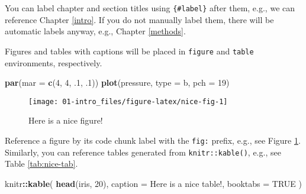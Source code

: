 \documentclass[
]{book}
\newenvironment{Shaded}{\begin{snugshade}}{\end{snugshade}}
\newcommand{\AttributeTok}[1]{\textcolor[rgb]{0.13,0.29,0.53}{#1}}
\newcommand{\ConstantTok}[1]{\textcolor[rgb]{0.56,0.35,0.01}{#1}}
\newcommand{\DecValTok}[1]{\textcolor[rgb]{0.00,0.00,0.81}{#1}}
\newcommand{\FunctionTok}[1]{\textcolor[rgb]{0.13,0.29,0.53}{\textbf{#1}}}
\newcommand{\NormalTok}[1]{#1}
\newcommand{\SpecialCharTok}[1]{\textcolor[rgb]{0.81,0.36,0.00}{\textbf{#1}}}
\newcommand{\StringTok}[1]{\textcolor[rgb]{0.31,0.60,0.02}{#1}}
\begin{document}
You can label chapter and section titles using \texttt{\{\#label\}} after them, e.g., we can reference Chapter \ref{intro}. If you do not manually label them, there will be automatic labels anyway, e.g., Chapter \ref{methods}.

Figures and tables with captions will be placed in \texttt{figure} and \texttt{table} environments, respectively.

\begin{Shaded}
\begin{Highlighting}[]
\FunctionTok{par}\NormalTok{(}\AttributeTok{mar =} \FunctionTok{c}\NormalTok{(}\DecValTok{4}\NormalTok{, }\DecValTok{4}\NormalTok{, .}\DecValTok{1}\NormalTok{, .}\DecValTok{1}\NormalTok{))}
\FunctionTok{plot}\NormalTok{(pressure, }\AttributeTok{type =} \StringTok{\textquotesingle{}b\textquotesingle{}}\NormalTok{, }\AttributeTok{pch =} \DecValTok{19}\NormalTok{)}
\end{Highlighting}
\end{Shaded}

\begin{figure}

{\centering \texttt{[image: 01-intro\_files/figure-latex/nice-fig-1]} 

}

\caption{Here is a nice figure!}\label{fig:nice-fig}
\end{figure}

Reference a figure by its code chunk label with the \texttt{fig:} prefix, e.g., see Figure \ref{fig:nice-fig}. Similarly, you can reference tables generated from \texttt{knitr::kable()}, e.g., see Table \ref{tab:nice-tab}.

\begin{Shaded}
\begin{Highlighting}[]
\NormalTok{knitr}\SpecialCharTok{::}\FunctionTok{kable}\NormalTok{(}
  \FunctionTok{head}\NormalTok{(iris, }\DecValTok{20}\NormalTok{), }\AttributeTok{caption =} \StringTok{\textquotesingle{}Here is a nice table!\textquotesingle{}}\NormalTok{,}
  \AttributeTok{booktabs =} \ConstantTok{TRUE}
\NormalTok{)}
\end{Highlighting}
\end{Shaded}
\end{document}
